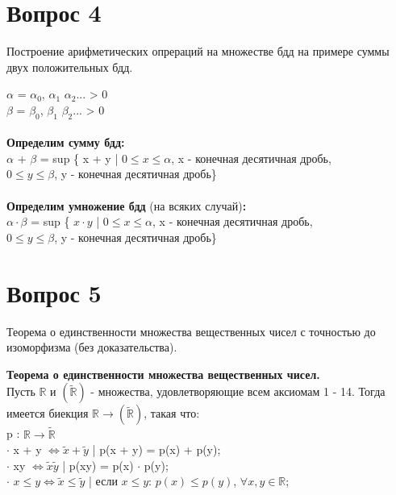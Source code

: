 \documentclass{article}
\DeclareMathOperator{\Forall}{\forall}
\begin{document}
\section*{Вопрос 4}
 
\begin{center}
 {Построение арифметических опрераций на множестве бдд на примере суммы двух положительных бдд.}
\end{center}
 
   $\alpha$ = $\alpha_0$, $\alpha_1$ $\alpha_2$... > 0\\
   $\beta$ = $\beta_0$, $\beta_1$ $\beta_2$... > 0\\
   \\
   \textbf{Определим сумму бдд: }\\
   $\alpha$ + $\beta$ = sup \{ x + y | $ 0 \leq x \leq \alpha $, x - конечная десятичная дробь, \\
   $ 0 \leq y \leq \beta $, y - конечная десятичная дробь\} \\
   \\
   \textbf{Определим умножение бдд} (на всяких случай)\textbf{:} \\
   $\alpha \cdot \beta$ = sup \{ $x \cdot y $ | $ 0 \leq x \leq \alpha $, x - конечная десятичная дробь, \\
   $ 0 \leq y \leq \beta $, y - конечная десятичная дробь\} \\
\newpage
\section*{Вопрос 5}
 
\begin{center}
   {Теорема о единственности множества вещественных чисел с точностью до изоморфизма (без доказательства).}
\end{center}
 
   \textbf{Теорема о единственности множества вещественных чисел.} \\
   Пусть $\mathbb{R}$ и $ (\widetilde{\mathbb{R}})$ - множества, удовлетворяющие всем аксиомам 1 - 14. Тогда имеется биекция $\mathbb{R} \rightarrow (\widetilde{\mathbb{R}})$, такая что: \\
   p : $\mathbb{R} \rightarrow \widetilde{\mathbb{R}}$ \\
   $\cdot $ x + y $\Longleftrightarrow \tilde{x} + \tilde{y} $ | p(x + y) = p(x) + p(y); \\
   $\cdot $ xy $\Longleftrightarrow \tilde{x} \tilde{y}$ |  p(xy) = p(x) $\cdot$ p(y); \\
   $\cdot$  $x \leq y \Longleftrightarrow \tilde{x} \leq \tilde{y} $ | если $x \leq y$: $p(x) \leq p(y)$, $\Forall x,y \in \mathbb{R}$; \\
 
\end{document}
